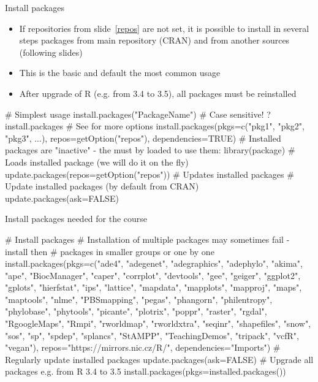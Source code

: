 \documentclass[compress, ucs, xelatex, 11pt, xcolor=svgnames,
	hyperref={
		bookmarks=true,
		unicode=true,
		colorlinks=true,
		pdftitle={Molecular data in R},
		plainpages=false,
		pdfauthor={Vojtech Zeisek},
		pdfsubject={Course about phylogeny and evolution in R},
		pdfcreator={XeLaTeX},
		pdfkeywords={R, evolution, phylogeny, molecular data},
		linkcolor=Tomato,
		anchorcolor=SaddleBrown,
		citecolor=Goldenrod,
		filecolor=DarkMagenta,
		menucolor=Sienna,
		urlcolor=DarkTurquoise,
		pdftex},
	url={hyphens, lowtilde} %
	]{beamer}
\begin{document}
\begin{frame}[fragile]{Install packages}
	\begin{itemize}
		\item If repositories from slide~\ref{repos} are not set, it is possible to install in several steps packages from main repository (CRAN) and from another sources (following slides)
		\item This is the basic and default the most common usage
		\item After upgrade of R (e.g. from 3.4 to 3.5), all packages must be reinstalled
	\end{itemize}
	\begin{spluscode}
    # Simplest usage
    install.packages("PackageName") # Case sensitive!
    ?install.packages # See for more options
    install.packages(pkgs=c("pkg1", "pkg2", "pkg3", ...),
      repos=getOption("repos"), dependencies=TRUE)
    # Installed packages are "inactive" - the must by loaded to use them:
    library(package) # Loads installed package (we will do it on the fly)
    update.packages(repos=getOption("repos")) # Updates installed packages
    # Update installed packages (by default from CRAN)
    update.packages(ask=FALSE)
	\end{spluscode}
\end{frame}

\begin{frame}[fragile]{Install packages needed for the course}
	\begin{spluscode}
    # Install packages
    # Installation of multiple packages may sometimes fail - install then
    # packages in smaller groups or one by one
    install.packages(pkgs=c("ade4", "adegenet", "adegraphics", "adephylo",
      "akima", "ape", "BiocManager", "caper", "corrplot", "devtools",
      "gee", "geiger", "ggplot2", "gplots", "hierfstat", "ips", "lattice",
      "mapdata", "mapplots", "mapproj", "maps", "maptools", "nlme",
      "PBSmapping", "pegas", "phangorn", "philentropy", "phylobase",
      "phytools", "picante", "plotrix", "poppr", "raster", "rgdal",
      "RgoogleMaps", "Rmpi", "rworldmap",  "rworldxtra", "seqinr",
      "shapefiles", "snow", "sos", "sp", "spdep", "splancs", "StAMPP",
      "TeachingDemos", "tripack", "vcfR", "vegan"),
      repos="https://mirrors.nic.cz/R/", dependencies="Imports")
    # Regularly update installed packages
    update.packages(ask=FALSE)
    # Upgrade all packages e.g. from R 3.4 to 3.5
    install.packages(pkgs=installed.packages())
	\end{spluscode}
\end{frame}
\end{document}
